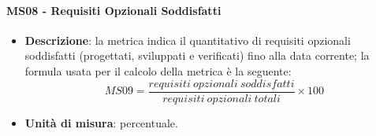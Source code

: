 		\paragraph{MS08 - Requisiti Opzionali Soddisfatti}
		\begin{itemize}
			\item \textbf{Descrizione}: la metrica indica il quantitativo di requisiti opzionali soddisfatti (progettati, sviluppati e verificati) fino alla data corrente; la formula usata per il calcolo della metrica è la seguente:
            \[
            MS09 = \frac{requisiti\ opzionali\ soddisfatti}{requisiti\ opzionali\ totali} \times 100
            \]
			\item \textbf{Unità di misura}: percentuale.
		\end{itemize}